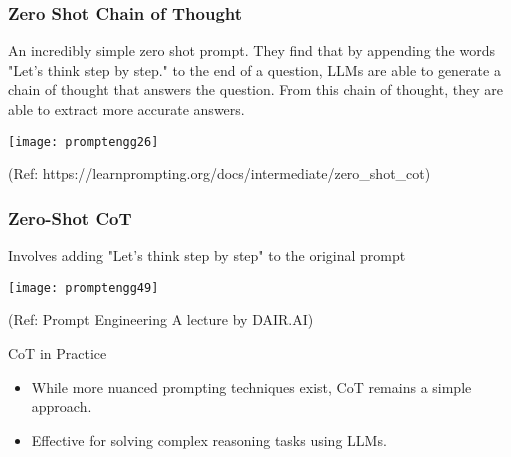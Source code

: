 \begin{frame}[fragile]\frametitle{Zero Shot Chain of Thought}

An incredibly simple zero shot prompt. They find that by appending the words "Let's think step by step." to the end of a question, LLMs are able to generate a chain of thought that answers the question. From this chain of thought, they are able to extract more accurate answers.

\begin{center}
\texttt{[image: promptengg26]}

{\tiny (Ref: https://learnprompting.org/docs/intermediate/zero\_shot\_cot)}

\end{center}		

\end{frame}

\begin{frame}[fragile]\frametitle{Zero-Shot CoT}

 Involves adding "Let's think step by step" to the original 
prompt


\begin{center}
\texttt{[image: promptengg49]}

{\tiny (Ref: Prompt Engineering A lecture by DAIR.AI)}

\end{center}	

\end{frame}

\begin{frame}[fragile]{CoT in Practice}
    \begin{itemize}
        \item While more nuanced prompting techniques exist, CoT remains a simple approach.
        \item Effective for solving complex reasoning tasks using LLMs.
    \end{itemize}
\end{frame}


